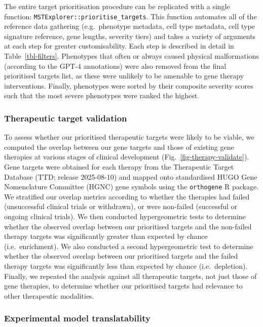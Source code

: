 \documentclass[
]{article}
\begin{document}
The entire target prioritisation procedure can be replicated with a
single function: \texttt{MSTExplorer::prioritise\_targets}. This
function automates all of the reference data gathering (e.g.~phenotype
metadata, cell type metadata, cell type signature reference, gene
lengths, severity tiers) and takes a variety of arguments at each step
for greater customisability. Each step is described in detail in
Table~\ref{tbl-filters}. Phenotypes that often or always caused physical
malformations (according to the GPT-4 annotations) were also removed
from the final prioritised targets list, as these were unlikely to be
amenable to gene therapy interventions. Finally, phenotypes were sorted
by their composite severity scores such that the most severe phenotypes
were ranked the highest.

\subsubsection{Therapeutic target
validation}\label{therapeutic-target-validation-1}

To assess whether our prioritised therapeutic targets were likely to be
viable, we computed the overlap between our gene targets and those of
existing gene therapies at various stages of clinical development
(Fig.~\ref{fig-therapy-validate}). Gene targets were obtained for each
therapy from the Therapeutic Target Database (TTD; release 2025-08-10)
and mapped onto standardised HUGO Gene Nomenclature Committee (HGNC)
gene symbols using the \texttt{orthogene} R package. We stratified our
overlap metrics according to whether the therapies had failed
(unsuccessful clinical trials or withdrawn), or were non-failed
(successful or ongoing clinical trials). We then conducted
hypergeometric tests to determine whether the observed overlap between
our prioritised targets and the non-failed therapy targets was
significantly greater than expected by chance (i.e.~enrichment). We also
conducted a second hypergeometric test to determine whether the observed
overlap between our prioritised targets and the failed therapy targets
was significantly less than expected by chance (i.e.~depletion).
Finally, we repeated the analysis against all therapeutic targets, not
just those of gene therapies, to determine whether our prioritised
targets had relevance to other therapeutic modalities.

\subsubsection{Experimental model
translatability}\label{experimental-model-translatability}
\end{document}
